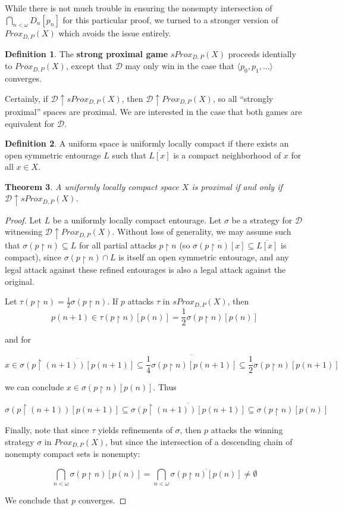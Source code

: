 \documentclass{amsart}
\newtheorem{thm}{Theorem}[section]
\theoremstyle{definition}
\newtheorem{defn}[thm]{Definition}
\theoremstyle{remark}
\newcommand{\<}{\langle}
\renewcommand{\>}{\rangle}
\newcommand{\cl}[1]{\overline{#1}}
\newcommand{\proxgame}[1]{Prox_{D,P}(#1)}
\newcommand{\sproxgame}[1]{sProx_{D,P}(#1)}
\newcommand{\pl}[1]{\mathscr{#1}}
\newcommand{\win}{\uparrow}
\newcommand{\rest}{\restriction}
\begin{document}
While there is not much trouble in ensuring the nonempty intersection of\\ $\bigcap_{n<\omega} D_n[p_n]$ for this particular proof, we turned to a stronger version of $\proxgame{X}$ which avoids the issue entirely.

\begin{defn}
  The \textbf{strong proximal game} $\sproxgame{X}$ proceeds identially to $\proxgame{X}$, except that $\pl D$ may only win in the case that $\<p_0,p_1,\dots\>$ converges.
\end{defn}

Certainly, if $\pl D\win \sproxgame{X}$, then $\pl D\win \proxgame{X}$, so all ``strongly proximal'' spaces are proximal. We are interested in the case that both games are equivalent for $\pl D$.

\begin{defn}
  A uniform space is uniformly locally compact if there exists an open symmetric entourage $L$ such that $\cl{L[x]}$ is a compact neighborhood of $x$ for all $x\in X$.
\end{defn}

\begin{thm}
  A uniformly locally compact space $X$ is proximal if and only if $\pl D\win \sproxgame{X}$.
\end{thm}

\begin{proof}
  Let $L$ be a uniformly locally compact entourage. Let $\sigma$ be a strategy for $\pl D$ witnessing $\pl D\win \proxgame{X}$. Without loss of generality, we may assume such that $\sigma(p\rest n)\subseteq L$ for all partial attacks $p\rest n$ (so $\cl{\sigma(p\rest n)[x]}\subseteq\cl{L[x]}$ is compact), since $\sigma(p\rest n)\cap L$ is itself an open symmetric entourage, and any legal attack against these refined entourages is also a legal attack against the original.

  Let $\tau(p\rest n)=\frac{1}{2}\sigma(p\rest n)$. If $p$ attacks $\tau$ in $\sproxgame{X}$, then
    \[
      p(n+1)
        \in
      \tau(p\rest n)[p(n)]
        =
      \frac{1}{2}\sigma(p\rest n)[p(n)]
    \]

    and for

    \[
      x
        \in
      \cl{\sigma(p\rest (n+1))[p(n+1)]}
        \subseteq
      \cl{\frac{1}{4}\sigma(p\rest n)[p(n+1)]}
        \subseteq
      \frac{1}{2}\sigma(p\rest n)[p(n+1)]
    \]

  we can conclude $x\in\sigma(p\rest n)[p(n)]$. Thus

    \[
      \sigma(p\rest (n+1))[p(n+1)]
        \subseteq
      \cl{\sigma(p\rest (n+1))[p(n+1)]}
        \subseteq
      \sigma(p\rest n)[p(n)]
    \]

  Finally, note that since $\tau$ yields refinements of $\sigma$, then $p$ attacks the winning strategy $\sigma$ in $\proxgame{X}$, but since the intersection of a descending chain of nonempty compact sets is nonempty:

    \[
      \bigcap_{n<\omega} \sigma(p\rest n)[p(n)]
        =
      \bigcap_{n<\omega} \cl{\sigma(p\rest n)[p(n)]}
        \not=
      \emptyset
    \]

  We conclude that $p$ converges.
\end{proof} 
\end{document}
